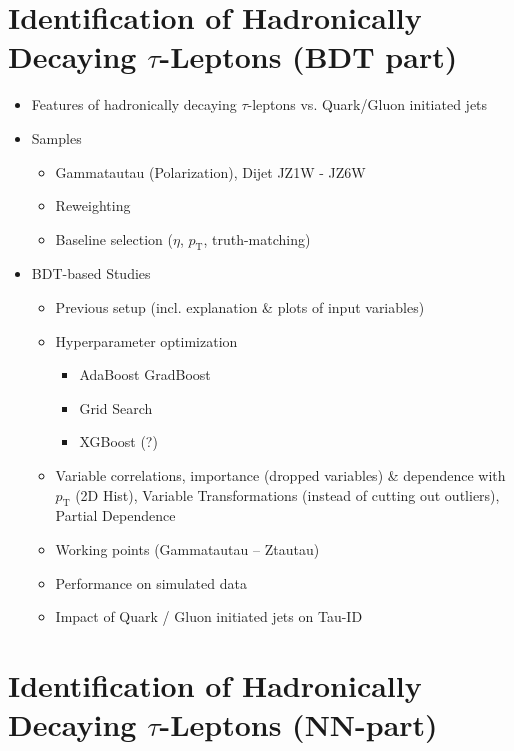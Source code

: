 \section{Identification of Hadronically Decaying $\tau$-Leptons (BDT part)}

\begin{itemize}
\item Features of hadronically decaying $\tau$-leptons vs. Quark/Gluon
  initiated jets

\item Samples
  \begin{itemize}
  \item Gammatautau (Polarization), Dijet JZ1W - JZ6W
  \item Reweighting
  \item Baseline selection ($\eta$, $p_\mathrm{T}$, truth-matching)
  \end{itemize}

\item BDT-based Studies
  \begin{itemize}
  \item Previous setup (incl. explanation \& plots of input variables)
  \item Hyperparameter optimization
    \begin{itemize}
    \item AdaBoost \textrightarrow GradBoost
    \item Grid Search
    \item XGBoost (?)
    \end{itemize}
  \item Variable correlations, importance (dropped variables) \& dependence with
    $p_\mathrm{T}$ (2D Hist), Variable Transformations (instead of cutting out
    outliers), Partial Dependence
  \item Working points (Gammatautau -- Ztautau)
  \item Performance on simulated data
  \item Impact of Quark / Gluon initiated jets on Tau-ID
  \end{itemize}

\end{itemize}

\section{Identification of Hadronically Decaying $\tau$-Leptons (NN-part)}

